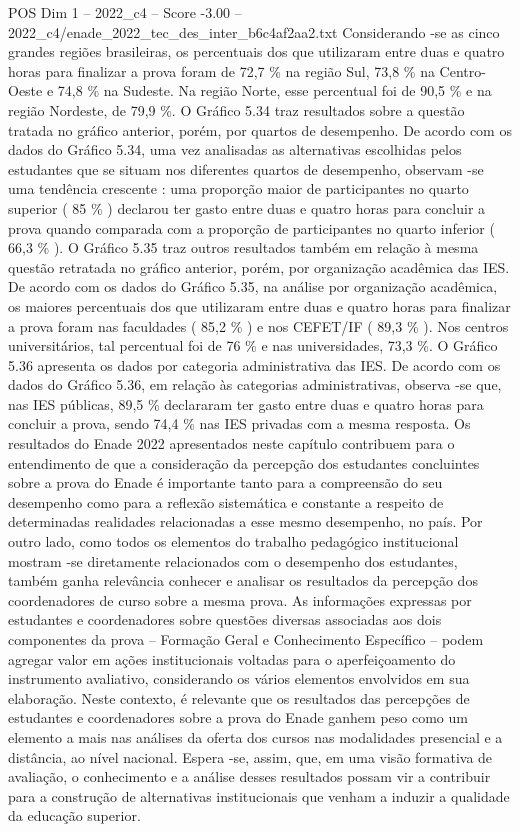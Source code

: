\begin{textsample}{POS Dim 1 – 2022\_c4 – Score -3.00 – 2022\_c4/enade\_2022\_tec\_des\_inter\_b6c4af2aa2.txt}
Considerando -se as cinco grandes regiões brasileiras, os percentuais dos que utilizaram entre duas e quatro horas para finalizar a prova foram de 72,7 \% na região Sul, 73,8 \% na Centro-Oeste e 74,8 \% na Sudeste.
Na região Norte, esse percentual foi de 90,5 \% e na região Nordeste, de 79,9 \%.
O Gráfico 5.34 traz resultados sobre a questão tratada no gráfico anterior, porém, por quartos de desempenho.
De acordo com os dados do Gráfico 5.34, uma vez analisadas as alternativas escolhidas pelos estudantes que se situam nos diferentes quartos de desempenho, observam -se uma tendência crescente : uma proporção maior de participantes no quarto superior ( 85 \% ) declarou ter gasto entre duas e quatro horas para concluir a prova quando comparada com a proporção de participantes no quarto inferior ( 66,3 \% ).
O Gráfico 5.35 traz outros resultados também em relação à mesma questão retratada no gráfico anterior, porém, por organização acadêmica das IES.
De acordo com os dados do Gráfico 5.35, na análise por organização acadêmica, os maiores percentuais dos que utilizaram entre duas e quatro horas para finalizar a prova foram nas faculdades ( 85,2 \% ) e nos CEFET/IF ( 89,3 \% ).
Nos centros universitários, tal percentual foi de 76 \% e nas universidades, 73,3 \%.
O Gráfico 5.36 apresenta os dados por categoria administrativa das IES.
De acordo com os dados do Gráfico 5.36, em relação às categorias administrativas, observa -se que, nas IES públicas, 89,5 \% declararam ter gasto entre duas e quatro horas para concluir a prova, sendo 74,4 \% nas IES privadas com a mesma resposta.
Os resultados do Enade 2022 apresentados neste capítulo contribuem para o entendimento de que a consideração da percepção dos estudantes concluintes sobre a prova do Enade é importante tanto para a compreensão do seu desempenho como para a reflexão sistemática e constante a respeito de determinadas realidades relacionadas a esse mesmo desempenho, no país.
Por outro lado, como todos os elementos do trabalho pedagógico institucional mostram -se diretamente relacionados com o desempenho dos estudantes, também ganha relevância conhecer e analisar os resultados da percepção dos coordenadores de curso sobre a mesma prova.
As informações expressas por estudantes e coordenadores sobre questões diversas associadas aos dois componentes da prova – Formação Geral e Conhecimento Específico – podem agregar valor em ações institucionais voltadas para o aperfeiçoamento do instrumento avaliativo, considerando os vários elementos envolvidos em sua elaboração.
Neste contexto, é relevante que os resultados das percepções de estudantes e coordenadores sobre a prova do Enade ganhem peso como um elemento a mais nas análises da oferta dos cursos nas modalidades presencial e a distância, ao nível nacional.
Espera -se, assim, que, em uma visão formativa de avaliação, o conhecimento e a análise desses resultados possam vir a contribuir para a construção de alternativas institucionais que venham a induzir a qualidade da educação superior.

\end{textsample}
